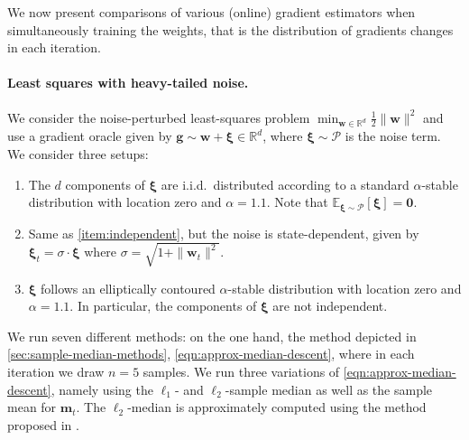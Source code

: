\documentclass[10pt]{article} %
\renewcommand{\vec}[1]{\bm{#1}}
\newcommand{\R}{\mathbb{R}}
\newcommand{\EE}[2]{\mathbb{E}_{#1}\left[#2\right] }
\begin{document}
We now present comparisons of various (online) gradient estimators when simultaneously training the weights, that is the distribution of gradients changes in each iteration.

\paragraph{Least squares with heavy-tailed noise.} We consider the noise-perturbed least-squares problem $\min_{\vec{w}\in \R^d} \tfrac12 \| \vec{w} \|^2$
and use a gradient oracle given by $\vec{g} \sim \vec{w} + \vec{\xi} \in \R^d$, where $\vec{\xi} \sim \mathcal{P}$ is the noise term.
We consider three setups:
\begin{enumerate}[label=(S\arabic*)]
    \item \label{item:independent} The $d$ components of $\vec{\xi}$ are i.i.d.\ distributed according to a standard $\alpha$-stable distribution with location zero and $\alpha=1.1$. Note that $\EE{\vec{\xi} \sim \mathcal{P}}{\vec{\xi}} = \vec{0}$.
    \item \label{item:independent-state} Same as \ref{item:independent}, but the noise is state-dependent, given by $\vec{\xi}_t = \sigma \cdot \vec{\xi}$ where $\sigma = \sqrt{1+\|\vec{w}_t\|^2}$.
    \item \label{item:dependent} $\vec{\xi}$ follows an elliptically contoured $\alpha$-stable distribution \citep{Nolan2013} with location zero and $\alpha=1.1$. In particular, the components of $\vec{\xi}$ are not independent.
\end{enumerate}

We run seven different methods: on the one hand, the method depicted in \cref{sec:sample-median-methods}, \eqref{eqn:approx-median-descent}, where in each iteration we draw $n=5$ samples. We run three variations of \eqref{eqn:approx-median-descent}, namely using the $\ell_1$- and $\ell_2$-sample median as well as the sample mean for $\vec{m}_t$. The $\ell_2$-median is approximately computed using the method proposed in \citet{Vardi2000}. 
\end{document}
